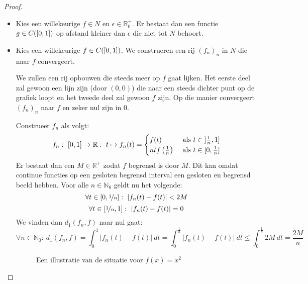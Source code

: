 \documentclass[main.tex]{subfiles}
\begin{document}
\begin{vb}
  \begin{proof}
    \noindent
    \begin{itemize}
    \item 
      Kies een willekeurige $f\in N$ en $\epsilon\in \mathbb{R}_{0}^{+}$.
      Er bestaat dan een functie $g\in C(\interval{0}{1})$ op afstand kleiner dan $\epsilon$ die niet tot $N$ behoort.
    \item
      Kies een willekeurige $f\in C(\interval{0}{1})$.
      We construeren een rij $(f_{n})_{n}$ in $N$ die naar $f$ convergeert.
      \begin{klad}
        We zullen een rij opbouwen die steeds meer op $f$ gaat lijken.
        Het eerste deel zal gewoon een lijn zijn (door $(0,0)$) die naar een steeds dichter punt op de grafiek loopt en het tweede deel zal gewoon $f$ zijn.
        Op die manier convergeert $(f_{n})_{n}$ naar $f$ en zeker nul zijn in $0$.
      \end{klad}
      Construeer $f_{n}$ als volgt:
      \[ f_{n}:\ \interval{0}{1} \rightarrow \mathbb{R}:\ t \mapsto f_{n}(t) = 
      \begin{cases}
        f(t) &\text{ als } t \in \interval[open left]{\frac{1}{n}}{1}\\
        ntf\left(\frac{1}{n}\right) &\text{ als } t \in \interval{0}{\frac{1}{n}}
      \end{cases}
      \]
      Er bestaat dan een $M\in \mathbb{R}^{+}$ zodat $f$ begrensd is door $M$.
      Dit kan omdat continue functies op een gesloten begrensd interval een gesloten en begrensd beeld hebben.\needed
      Voor alle $n\in \mathbb{N}_{0}$ geldt nu het volgende:\waarom
      \[ \forall t\in \interval{0}{\nicefrac{1}{n}}:\ |f_{n}(t) - f(t)| < 2M \]
      \[ \forall t\in \interval{\nicefrac{1}{n}}{1}:\ |f_{n}(t) - f(t)| = 0 \]
      We vinden dan $d_{1}(f_{n},f)$ naar nul gaat:
      \[
      \forall n\in \mathbb{N}_{0}:\ 
      d_{1}(f_{n},f)
      = \int_{0}^{1}|f_{n}(t)-f(t)|\ dt
      = \int_{0}^{\frac{1}{n}}|f_{n}(t)-f(t)|\ dt
      \le \int_{0}^{\frac{1}{n}}2M\ dt
      = \frac{2M}{n}
      \]
    \begin{figure}[H]
      \centering
      \caption{ Een illustratie van de situatie voor $f(x) = x^{2}$}
    \end{figure}
    \end{itemize}
  \end{proof}
\end{vb}
\end{document}
